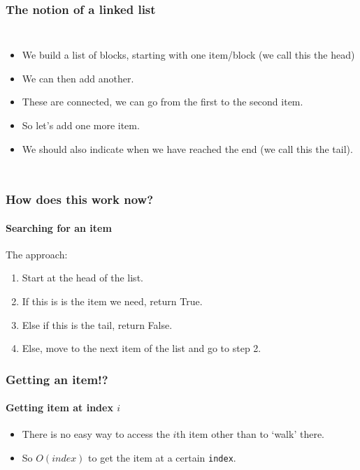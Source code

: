 \begin{frame}
	\frametitle{The notion of a linked list}
	\begin{columns}
			\begin{itemize}
				\item We build a list of blocks, starting with one item/block (we call this the \alert{head})
				\item<2-> We can then add another.
				\item<3-> These are connected, we can go from the first to the second item.
				\item<4-> So let's add one more item.
				\item<5-> We should also indicate when we have reached the end (we call this the \alert{tail}).
			\end{itemize}
		
	\end{columns}
\end{frame}

\begin{frame}
	\frametitle{How does this work now?}
	\framesubtitle{Searching for an item}	
	The approach:
	\begin{enumerate}
		\item Start at the head of the list.
		\item<2-> If this is is the item we need, return True.
		\item<2-> Else if this is the tail, return False.
		\item<3-> Else, move to the next item of the list and go to step 2.
	\end{enumerate}

		
	
\end{frame}

\begin{frame}
	\frametitle{Getting an item!?}
	\framesubtitle{Getting item at index $i$}

	\begin{itemize}
		\item There is no easy way to access the $i$th item other than to `walk' there.
		\item So $O(\textit{index})$ to get the item at a certain \texttt{index}.
	\end{itemize}
	
\end{frame}


